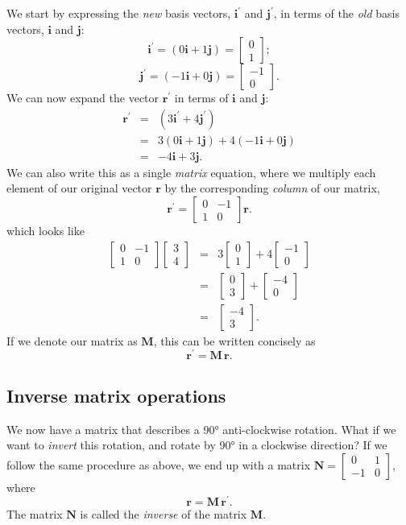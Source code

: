 \documentclass[a4paper]{article}
\newcommand{\bvec}[1]{\mathbf{#1}}
\newcommand{\cvec}[2]{\begin{bmatrix}#1\\#2\end{bmatrix}}
\begin{document}
We start by expressing the \emph{new} basis vectors, $\bvec{i^\prime}$ and $\bvec{j^\prime}$, in terms of the \emph{old} basis vectors, $\bvec{i}$ and $\bvec{j}$:
\begin{equation*}
\bvec{i^\prime} = (0\bvec{i}+1\bvec{j}) = \cvec{0}{1};
\end{equation*}
\begin{equation*}
\bvec{j^\prime} = (-1\bvec{i}+0\bvec{j}) = \cvec{-1}{0}.
\end{equation*}
We can now expand the vector $\bvec{r^\prime}$ in terms of $\bvec{i}$ and $\bvec{j}$:
\begin{eqnarray*}
\bvec{r^\prime}&=&(3\bvec{i^\prime}+4\bvec{j^\prime})\\
               &=&3(0\bvec{i}+1\bvec{j})+4(-1\bvec{i}+0\bvec{j})\\
               &=&-4\bvec{i}+3\bvec{j}.
\end{eqnarray*}
We can also write this as a single \emph{matrix} equation, where we multiply each element of our original vector $\bvec{r}$ by the corresponding \emph{column} of our matrix,
\begin{equation*}
\bvec{r^\prime} = \begin{bmatrix}0 & -1 \\ 1 & 0\end{bmatrix}\bvec{r}.
\end{equation*}
which looks like
\begin{eqnarray*}
\begin{bmatrix}0 & -1 \\ 1 & 0\end{bmatrix}\cvec{3}{4} & = & 3\cvec{0}{1}+4\cvec{-1}{0} \\
  & = & \cvec{0}{3} + \cvec{-4}{0} \\
  & = & \cvec{-4}{3}.
\end{eqnarray*}
If we denote our matrix as $\bvec{M}$, this can be written concisely as
\begin{equation*}
\bvec{r^\prime} = \bvec{M}\,\bvec{r}.
\end{equation*}
\subsection{Inverse matrix operations}
We now have a matrix that describes a \ang{90} anti-clockwise rotation. What if we want to \emph{invert} this rotation, and rotate by \ang{90} in a clockwise direction? If we follow the same procedure as above, we end up with a matrix $\bvec{N}=\begin{bmatrix}0 & 1\\ -1 & 0\end{bmatrix}$, where
\begin{equation*}
\bvec{r} = \bvec{M}\,\bvec{r^\prime}.
\end{equation*}
The matrix $\bvec{N}$ is called the \emph{inverse} of the matrix $\bvec{M}$.
\end{document}
